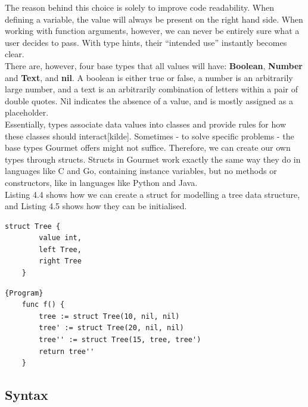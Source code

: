 The reason behind this choice is solely to improve code readability. When defining a variable, the value will always be present on the right hand side. When working with function arguments, however, we can never be entirely sure what a user decides to pass. With type hints, their ``intended use'' instantly becomes clear. \hfill \\

There are, however, four base types that all values will have: \textbf{Boolean}, \textbf{Number} and \textbf{Text}, and \textbf{nil}. A boolean is either true or false, a number is an arbitrarily large number, and a text is an arbitrarily combination of letters within a pair of double quotes. Nil indicates the absence of a value, and is mostly assigned as a placeholder. \hfill \\

Essentially, types associate data values into classes and provide rules for how these classes should interact[kilde]. Sometimes - to solve specific problems - the base types Gourmet offers might not suffice. Therefore, we can create our own types through structs. Structs in Gourmet work exactly the same way they do in languages like C and Go, containing instance variables, but no methods or constructors, like in languages like Python and Java. \hfill \\

Listing 4.4 shows how we can create a struct for modelling a tree data structure, and Listing 4.5 shows how they can be initialised. \hfill \\

\begin{lstlisting}[caption={A Gourmet struct Tree, with instance variables value, left and right}, captionpos=b, frame=tlrb]
    struct Tree {
        value int,
        left Tree,
        right Tree
    }
\end{lstlisting}

\begin{lstlisting}[caption=A function to initialise three tree structs and return the last one,captionpos=b, frame=tlrb]{Program}
    func f() {
        tree := struct Tree(10, nil, nil)
        tree' := struct Tree(20, nil, nil)
        tree'' := struct Tree(15, tree, tree')
        return tree''
    }
\end{lstlisting}

\subsection{Syntax}

